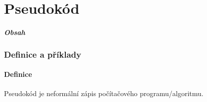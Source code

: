 \documentclass[aspectratio=169,11pt,handout]{beamer}
\begin{document}
%
%

\part[Pseudokód]{Pseudokód}

\begin{frame}
 \partpage
\end{frame}

\begin{frame}
 \frametitle{Obsah}
 \tableofcontents
\end{frame}

\section[Definice a příklady]{Definice a příklady}
\subsection[Definice]{Definice}

\begin{frame}
 \begin{tcolorbox}[title=Pseudokód,center,width=.95\textwidth]
  Pseudokód je \alert{neformální} zápis počítačového programu/algoritmu.
 \end{tcolorbox}
\end{frame}
\end{document}

